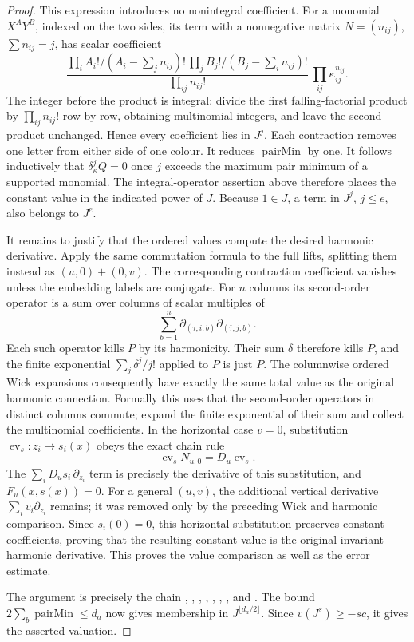 \begin{proof}
This expression introduces no nonintegral coefficient.
For a monomial \(X^AY^B\), indexed on the two sides, its term with
a nonnegative matrix \(N=(n_{ij})\), \(\sum n_{ij}=j\), has scalar
coefficient
\[
 \frac{\prod_i A_i!/(A_i-\sum_jn_{ij})!\,
       \prod_j B_j!/(B_j-\sum_in_{ij})!}
      {\prod_{ij}n_{ij}!}\ \prod_{ij}\kappa_{ij}^{n_{ij}} .
\]
The integer before the product is integral: divide the first
falling-factorial product by \(\prod_{ij}n_{ij}!\) row by row,
obtaining multinomial integers, and leave the second product
unchanged.  Hence every coefficient lies in \(J^j\).
Each contraction removes one letter from either side of one colour.
It reduces \(\operatorname{pairMin}\) by one.
It follows inductively that \(\delta_\kappa^jQ=0\) once \(j\)
exceeds the maximum pair minimum of a supported monomial.
The integral-operator assertion above therefore places the
constant value in the indicated power of \(J\).
Because \(1\in J\), a term in \(J^j\), \(j\le e\), also belongs
to \(J^e\).

It remains to justify that the ordered values compute the desired
harmonic derivative.  Apply the same commutation formula to the
full lifts, splitting them instead as \((u,0)+(0,v)\).
The corresponding contraction coefficient vanishes unless the
embedding labels are conjugate.
For \(n\) columns its second-order operator is a sum over columns
of scalar multiples of
\[
   \sum_{b=1}^n
        \partial_{(\tau,i,b)}
        \partial_{(\bar\tau,j,b)} .
\]
Each such operator kills \(P\) by its harmonicity.
Their sum \(\delta\) therefore kills \(P\), and the finite
exponential \(\sum_j\delta^j/j!\) applied to \(P\) is just \(P\).
The columnwise ordered Wick expansions consequently have exactly
the same total value as the original harmonic connection.
Formally this uses that the second-order operators in distinct
columns commute; expand the finite exponential of their sum and
collect the multinomial coefficients.
In the horizontal case \(v=0\), substitution
\(\operatorname{ev}_s:z_i\mapsto s_i(x)\) obeys the exact chain rule
\[
               \operatorname{ev}_s N_{u,0}
                             =D_u\operatorname{ev}_s .
\]
The \(\sum_iD_us_i\,\partial_{z_i}\) term is precisely the
derivative of this substitution, and \(F_u(x,s(x))=0\).
For a general \((u,v)\), the additional vertical derivative
\(\sum_iv_i\partial_{z_i}\) remains; it was removed only by the
preceding Wick and harmonic comparison.
Since \(s_i(0)=0\), this horizontal substitution preserves constant
coefficients, proving that the resulting constant value is the
original invariant harmonic derivative.  This proves the value comparison as well
as the error estimate.

The argument is precisely the chain
,
,
,
, ,
, , and
.
The bound \(2\sum_b\operatorname{pairMin}\le d_a\) now gives
membership in \(J^{\lfloor d_a/2\rfloor}\).
Since \(v(J^s)\ge-sc\), it gives the asserted valuation.
\end{proof}

